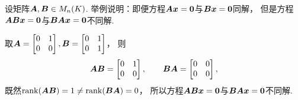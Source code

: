 \begin{example}
设矩阵\(\boldsymbol{A},\boldsymbol{B} \in M_n(K)\).
举例说明：即便方程\(\boldsymbol{A} \boldsymbol{x} = \boldsymbol0\)与\(\boldsymbol{B} \boldsymbol{x} = \boldsymbol0\)同解，
但是方程\(\boldsymbol{A} \boldsymbol{B} \boldsymbol{x} = \boldsymbol0\)与\(\boldsymbol{B} \boldsymbol{A} \boldsymbol{x} = \boldsymbol0\)不同解.
\begin{solution}
取\(\boldsymbol{A} = \begin{bmatrix}
	0 & 1 \\
	0 & 0
\end{bmatrix},
\boldsymbol{B} = \begin{bmatrix}
	0 & 1 \\
	0 & 1
\end{bmatrix}\)，
则\begin{equation*}
	\boldsymbol{A} \boldsymbol{B} = \begin{bmatrix}
		0 & 1 \\
		0 & 0
	\end{bmatrix},
	\qquad
	\boldsymbol{B} \boldsymbol{A} = \begin{bmatrix}
		0 & 0 \\
		0 & 0
	\end{bmatrix},
\end{equation*}
既然\(\rank(\boldsymbol{A} \boldsymbol{B}) = 1 \neq \rank(\boldsymbol{B} \boldsymbol{A}) = 0\)，
所以方程\(\boldsymbol{A} \boldsymbol{B} \boldsymbol{x} = \boldsymbol0\)与\(\boldsymbol{B} \boldsymbol{A} \boldsymbol{x} = \boldsymbol0\)不同解.
\end{solution}
\end{example}

